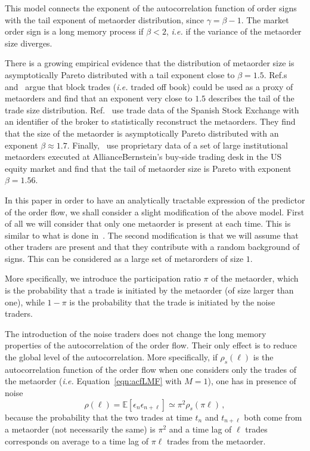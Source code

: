 \documentclass[12pt]{iopart}
\begin{document}
This model connects the exponent of the autocorrelation function of order signs with the tail exponent of metaorder distribution, since $\gamma=\beta-1$. The market order sign is a long memory process if $\beta<2$, \emph{i.e.} if the variance of the metaorder size diverges. 

There is a growing empirical evidence that the distribution of metaorder size is asymptotically Pareto distributed with a tail exponent close to $\beta=1.5$. Ref.s~\cite{gabaix2006institutional} and~\cite{lillo2005theory} argue that block trades (\emph{i.e.} traded off book) could be used as a proxy of metaorders and find that an exponent very close to $1.5$ describes the tail of the trade size distribution. Ref.~\cite{vaglica2008scaling} use trade data of the Spanish Stock Exchange with an identifier of the broker to statistically reconstruct the metaorders. They find that the size of the metaorder is asymptotically Pareto distributed with an exponent $\beta\approx 1.7$. Finally,~\cite{bershova2013impactlarge} use proprietary data of a set of large institutional metaorders executed at AllianceBernstein’s buy-side trading desk in the US equity market and find that the tail of metaorder size is Pareto with exponent $\beta=1.56$.

In this paper in order to have an analytically tractable expression of the predictor of the order flow, we shall consider a slight modification of the above model. First of all we will consider that only one metaorder is present at each time. This is similar to what is done in~\cite{toth2011anomalous,mastromatteo2013agent}. The second modification is that we will assume that other traders are present and that they contribute with a random background of signs. This can be considered as a large set of metarorders of size $1$. 

More specifically, we introduce the participation ratio $\pi$ of the metaorder, which is the probability that a trade is initiated by the metaorder (of size larger than one), while $1-\pi$ is the probability that the trade is initiated by the noise traders. 

The introduction of the noise traders does not change the long memory properties of the autocorrelation of the order flow. Their only effect is to reduce the global level of the autocorrelation. More specifically, if $\rho_s(\ell)$ is the autocorrelation function of the order flow when one considers only the trades of the metaorder (\emph{i.e.} Equation~\ref{eqn:acfLMF} with $M=1$), one has in presence of noise
\begin{equation*}
\rho(\ell)=\mathbb{E}[\epsilon_n \epsilon_{n+\ell}]\simeq\pi^2 \rho_s (\pi \ell)\,,
\end{equation*}
because the probability that the two trades at time $t_n$ and $t_{n+\ell}$ both come from a metaorder (not necessarily the same) is $\pi^2$ and a time lag of $\ell$ trades corresponds on average to a time lag of $\pi \ell$ trades from the metaorder.
\end{document}
